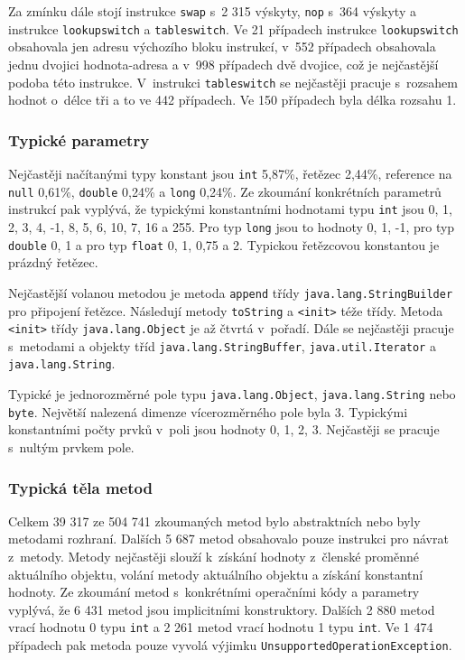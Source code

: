 Za zmínku dále stojí instrukce \texttt{swap} s~2 315 výskyty, \texttt{nop} s~364 výskyty a instrukce \texttt{lookupswitch} a \texttt{tableswitch}. Ve 21 případech instrukce \texttt{lookupswitch} obsahovala jen adresu výchozího bloku instrukcí, v~552 případech obsahovala jednu dvojici hodnota-adresa a v~998 případech dvě dvojice, což je nejčastější podoba této instrukce. V~instrukci \texttt{tableswitch} se nejčastěji pracuje s~rozsahem hodnot o~délce tři a to ve 442 případech. Ve 150 případech byla délka rozsahu 1.

\subsubsection{Typické parametry}

Nejčastěji načítanými typy konstant jsou \texttt{int} 5,87\%, řetězec 2,44\%, reference na \texttt{null} 0,61\%, \texttt{double} 0,24\% a \texttt{long} 0,24\%.
Ze zkoumání konkrétních parametrů instrukcí pak vyplývá, že typickými konstantními hodnotami typu \texttt{int} jsou 0, 1, 2, 3, 4, -1, 8, 5, 6, 10, 7, 16 a 255. Pro typ \texttt{long} jsou to hodnoty 0, 1, -1, pro typ \texttt{double} 0, 1 a pro typ \texttt{float} 0, 1, 0,75 a 2. Typickou řetězcovou konstantou je prázdný řetězec. 

Nejčastější volanou metodou je metoda \texttt{append} třídy \texttt{java.lang.StringBuilder} pro připojení řetězce. Následují metody \texttt{toString} a \texttt{<init>} téže třídy. Metoda \texttt{<init>} třídy \texttt{java.lang.Object} je až čtvrtá v~pořadí. Dále se nejčastěji pracuje s~metodami a objekty tříd \texttt{java.lang.StringBuffer}, \texttt{java.util.Iterator} a \texttt{java.lang.String}.

Typické je jednorozměrné pole typu \texttt{java.lang.Object}, \texttt{java.lang.String} nebo \texttt{byte}. Největší nalezená dimenze vícerozměrného pole byla 3. Typickými konstantními počty prvků v~poli jsou hodnoty 0, 1, 2, 3. Nejčastěji se pracuje s~nultým prvkem pole.

\subsubsection{Typická těla metod}

Celkem 39 317 ze 504 741 zkoumaných metod bylo abstraktních nebo byly metodami rozhraní. Dalších 5 687 metod obsahovalo pouze instrukci pro návrat z~metody. Metody nejčastěji slouží k~získání hodnoty z~členské proměnné aktuálního objektu, volání metody aktuálního objektu a získání konstantní hodnoty. Ze zkoumání metod s~konkrétními operačními kódy a parametry vyplývá, že 6 431 metod jsou implicitními konstruktory. Dalších 2 880 metod vrací hodnotu 0 typu \texttt{int} a 2 261 metod vrací hodnotu 1 typu \texttt{int}. Ve 1 474 případech pak metoda pouze vyvolá výjimku \texttt{UnsupportedOperationException}.


